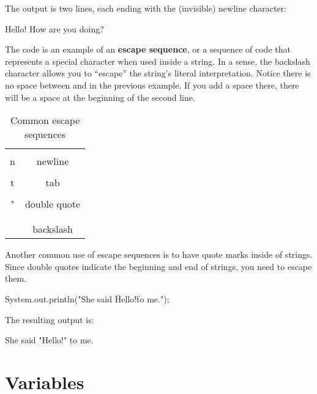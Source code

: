 The output is two lines, each ending with the (invisible) newline character:

\begin{stdout}
Hello!
How are you doing?
\end{stdout}


The code \java{\\n} is an example of an {\bf escape sequence}, or a sequence of code that represents a special character when used inside a string.
In a sense, the backslash character allows you to ``escape'' the string's literal interpretation.
Notice there is no space between \java{\\n} and  in the previous example.
If you add a space there, there will be a space at the beginning of the second line.

\begin{table}[h!]
\begin{tabular}{|c|c|}
\hline
\java{\\n} & newline \\
\hline
\java{\\t} & tab \\
\hline
\java{\\"} & double quote \\
\hline
\java{\\\\} & backslash \\
\hline
\end{tabular}
\caption{Common escape sequences}
\end{table}

Another common use of escape sequences is to have quote marks inside of strings.
Since double quotes indicate the beginning and end of strings, you need to escape them.

\begin{code}
    System.out.println("She said \"Hello!\" to me.");
\end{code}

The resulting output is:

\begin{stdout}
    She said "Hello!" to me.
\end{stdout}


\section{Variables}


